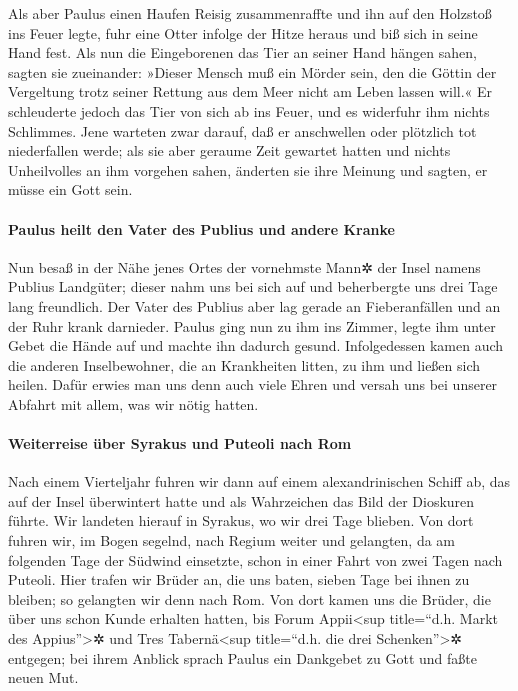  Als aber Paulus einen Haufen Reisig zusammenraffte und
ihn auf den Holzstoß ins Feuer legte, fuhr eine Otter infolge der Hitze
heraus und biß sich in seine Hand fest.  Als nun die
Eingeborenen das Tier an seiner Hand hängen sahen, sagten sie
zueinander: »Dieser Mensch muß ein Mörder sein, den die Göttin der
Vergeltung trotz seiner Rettung aus dem Meer nicht am Leben lassen
will.«  Er schleuderte jedoch das Tier von sich ab ins
Feuer, und es widerfuhr ihm nichts Schlimmes.  Jene
warteten zwar darauf, daß er anschwellen oder plötzlich tot niederfallen
werde; als sie aber geraume Zeit gewartet hatten und nichts Unheilvolles
an ihm vorgehen sahen, änderten sie ihre Meinung und sagten, er müsse
ein Gott sein.

\hypertarget{paulus-heilt-den-vater-des-publius-und-andere-kranke}{%
\paragraph{Paulus heilt den Vater des Publius und andere
Kranke}\label{paulus-heilt-den-vater-des-publius-und-andere-kranke}}

 Nun besaß in der Nähe jenes Ortes der vornehmste Mann✲
der Insel namens Publius Landgüter; dieser nahm uns bei sich auf und
beherbergte uns drei Tage lang freundlich.  Der Vater des
Publius aber lag gerade an Fieberanfällen und an der Ruhr krank
darnieder. Paulus ging nun zu ihm ins Zimmer, legte ihm unter Gebet die
Hände auf und machte ihn dadurch gesund.  Infolgedessen
kamen auch die anderen Inselbewohner, die an Krankheiten litten, zu ihm
und ließen sich heilen.  Dafür erwies man uns denn auch
viele Ehren und versah uns bei unserer Abfahrt mit allem, was wir nötig
hatten.

\hypertarget{weiterreise-uxfcber-syrakus-und-puteoli-nach-rom}{%
\paragraph{Weiterreise über Syrakus und Puteoli nach
Rom}\label{weiterreise-uxfcber-syrakus-und-puteoli-nach-rom}}

 Nach einem Vierteljahr fuhren wir dann auf einem
alexandrinischen Schiff ab, das auf der Insel überwintert hatte und als
Wahrzeichen das Bild der Dioskuren führte.  Wir landeten
hierauf in Syrakus, wo wir drei Tage blieben.  Von dort
fuhren wir, im Bogen segelnd, nach Regium weiter und gelangten, da am
folgenden Tage der Südwind einsetzte, schon in einer Fahrt von zwei
Tagen nach Puteoli.  Hier trafen wir Brüder an, die uns
baten, sieben Tage bei ihnen zu bleiben; so gelangten wir denn nach Rom.
 Von dort kamen uns die Brüder, die über uns schon Kunde
erhalten hatten, bis Forum Appii\textless sup title=``d.h. Markt des
Appius''\textgreater✲ und Tres Tabernä\textless sup title=``d.h. die
drei Schenken''\textgreater✲ entgegen; bei ihrem Anblick sprach Paulus
ein Dankgebet zu Gott und faßte neuen Mut.

